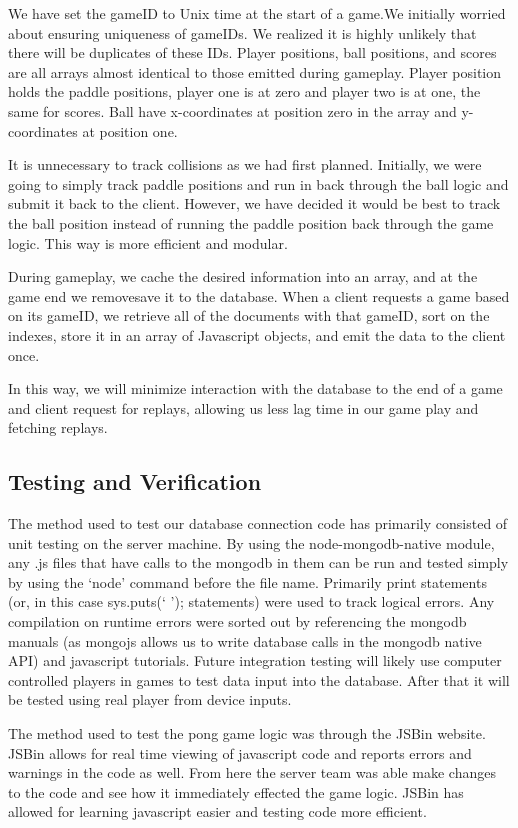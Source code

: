 \documentclass[letterpaper,12pt]{article}
\begin{document}
We have set the gameID to Unix time at the start of a game.We initially worried about ensuring uniqueness of gameIDs. We realized it is highly unlikely that there will be duplicates of these IDs.  Player positions, ball positions, and scores are all arrays almost identical to those emitted during gameplay. Player position holds the paddle positions, player one is at zero and player two is at one, the same for scores. Ball have x-coordinates at position zero in the array and y-coordinates at position one. 

It is unnecessary to track collisions as we had first planned. Initially, we were going to simply track paddle positions and run in back through the ball logic and submit it back to the client. However, we have decided it would be best to track the ball position instead of running the paddle position back through the game logic. This way is more efficient and modular.

During gameplay, we cache the desired information into an array, and at the game end we removesave it to the database. When a client requests a game based on its gameID, we retrieve all of the documents with that gameID, sort on the indexes, store it in an array of Javascript objects, and emit the data to the client once.

In this way, we will minimize interaction with the database to the end of a game and client request for replays, allowing us less lag time in our game play and fetching replays.

\subsection{Testing and Verification}

The method used to test our database connection code has primarily consisted of unit testing on the server machine. By using the node-mongodb-native module, any .js files that have calls to the mongodb in them can be run and tested simply by using the ‘node’ command before the file name. Primarily print statements (or, in this case sys.puts(‘ ’); statements) were used to track logical errors. Any compilation on runtime errors were sorted out by referencing the mongodb manuals (as mongojs allows us to write database calls in the mongodb native API) and javascript tutorials. Future integration testing will likely use computer controlled players in games to test data input into the database. After that it will be tested using real player from device inputs.

The method used to test the pong game logic was through the JSBin website. JSBin allows for real time viewing of javascript code and reports errors and warnings in the code as well. From here the server team was able make changes to the code and see how it immediately effected the game logic. JSBin has allowed for learning javascript easier and testing code more efficient.
\end{document}
